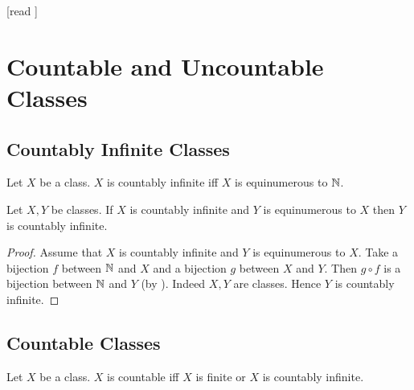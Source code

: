 \documentclass[10pt]{article}
\begin{document}
  \begin{imports}
    \begin{forthel}
      [read ]
    \end{forthel}
  \end{imports}


  \section*{Countable and Uncountable Classes}


  \subsection*{Countably Infinite Classes}

  \begin{forthel}
    \begin{definition}[id=FOUNDATIONS_14_6249029537103872,printid]
      Let $X$ be a class.
      $X$ is countably infinite iff $X$ is equinumerous to $\mathbb{N}$.
    \end{definition}
  \end{forthel}

  \begin{forthel}
    \begin{proposition}[id=FOUNDATIONS_14_803449379749888,printid]
      Let $X, Y$ be classes.
      If $X$ is countably infinite and $Y$ is equinumerous to $X$ then $Y$ is countably infinite.
    \end{proposition}
    \begin{proof}
      Assume that $X$ is countably infinite and $Y$ is equinumerous to $X$.
      Take a bijection $f$ between $\mathbb{N}$ and $X$ and a bijection $g$ between $X$ and $Y$.
      Then $g \circ f$ is a bijection between $\mathbb{N}$ and $Y$ (by ).
      Indeed $X, Y$ are classes.
      Hence $Y$ is countably infinite.
    \end{proof}
  \end{forthel}


  \subsection*{Countable Classes}

  \begin{forthel}
    \begin{definition}[id=FOUNDATIONS_14_5412969443753984,printid]
      Let $X$ be a class.
      $X$ is countable iff $X$ is finite or $X$ is countably infinite.
    \end{definition}
  \end{forthel}
\end{document}
